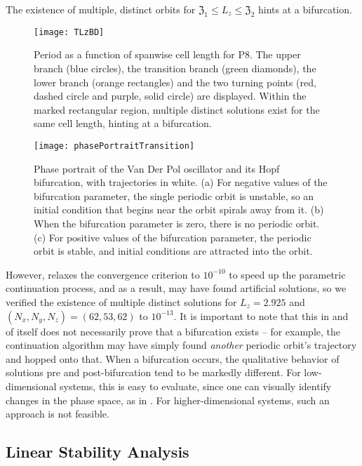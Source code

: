  The existence of multiple, distinct orbits for $\mathfrak{Z}_1 \leq L_z \leq \mathfrak{Z}_2$ hints at a bifurcation.
\begin{figure}[t]
\texttt{[image: TLzBD]}
\caption[Period as a function of spanwise cell length for P8.]{Period as a function of spanwise cell length for P8. The {upper branch} (blue circles), the {transition branch} (green diamonds), the { lower branch} (orange rectangles) and the two turning points (red, dashed circle and purple, solid circle) are displayed. Within the marked rectangular region, multiple distinct solutions exist for the same cell length, hinting at a bifurcation.}\label{fig:LZBif}
\end{figure}
\begin{figure}[t]
\texttt{[image: phasePortraitTransition]}
\caption[Phase portrait of the Van Der Pol oscillator and its Hopf bifurcation]{Phase portrait of the Van Der Pol oscillator and its Hopf bifurcation, with trajectories in white. (a) For negative values of the bifurcation parameter, the single periodic orbit is unstable, so an initial condition that begins near the orbit spirals away from it. (b) When the bifurcation parameter is zero, there is no periodic orbit. (c) For positive values of the bifurcation parameter, the periodic orbit is stable, and initial conditions are attracted into the orbit.}\label{fig:phasePortrait}
\end{figure}
However,  relaxes the convergence criterion to $10^{-10}$ to speed up the parametric continuation process, and as a result, may have found artificial solutions, so we verified the existence of multiple distinct solutions for $L_z = 2.925$ and $(N_x,N_y,N_z) = (62,53,62)$ to $10^{-13}$. It is important to note that this in and of itself does not necessarily prove that a bifurcation exists -- for example, the continuation algorithm may have simply found \emph{another} periodic orbit's trajectory and hopped onto that. When a bifurcation occurs, the qualitative behavior of solutions pre and post-bifurcation tend to be markedly different. For low-dimensional systems, this is easy to evaluate, since one can visually identify changes in the phase space, as in . For higher-dimensional systems, such an approach is not feasible. 

\subsection{Linear Stability Analysis}\label{sec:LSA}

